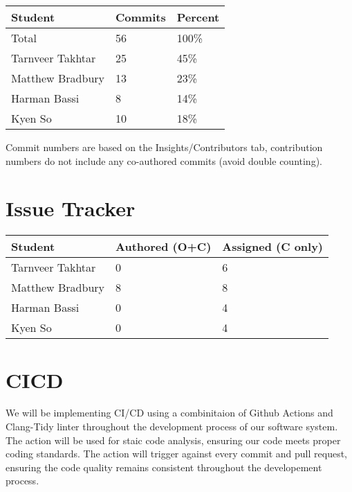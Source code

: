 \documentclass{article}
\begin{document}
\begin{table}[H]
\centering
\begin{tabular}{lll}
\toprule
\textbf{Student} & \textbf{Commits} & \textbf{Percent}\\
\midrule
Total & 56 & 100\% \\
Tarnveer Takhtar & 25 & 45\%\\
Matthew Bradbury & 13 & 23\%\\
Harman Bassi & 8 & 14\%\\
Kyen So & 10 & 18\%\\
\bottomrule
\end{tabular}
\end{table}

Commit numbers are based on the Insights/Contributors tab, contribution numbers do not include any co-authored commits (avoid double counting).

\section{Issue Tracker}



\begin{table}[H]
\centering
\begin{tabular}{lll}
\toprule
\textbf{Student} & \textbf{Authored (O+C)} & \textbf{Assigned (C only)}\\
\midrule
Tarnveer Takhtar & 0 & 6\\
Matthew Bradbury & 8 & 8\\
Harman Bassi & 0 & 4\\
Kyen So & 0 & 4\\
\bottomrule
\end{tabular}
\end{table}

\section{CICD}

We will be implementing CI/CD using a combinitaion of Github Actions and Clang-Tidy linter throughout the development process of our software system. 
The action will be used for staic code analysis, ensuring our code meets proper coding standards. 
The action will trigger against every commit and pull request, ensuring the code quality remains consistent throughout the developement process.
\end{document}
